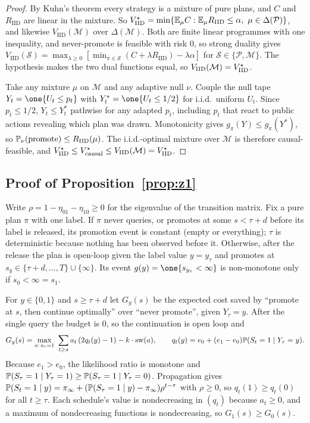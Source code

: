 \begin{proof}
By Kuhn's theorem every strategy is a mixture of pure plans, and $C$ and $R_{\mathrm{IID}}$ are linear in the mixture. So $V^\star_{\mathrm{IID}}=\min\{\mathbb{E}_\mu C:\mathbb{E}_\mu R_{\mathrm{IID}}\le\alpha,\ \mu\in\Delta(\mathcal P)\}$, and likewise $V_{\mathrm{IID}}(\mathcal M)$ over $\Delta(\mathcal M)$. Both are finite linear programmes with one inequality, and never-promote is feasible with risk 0, so strong duality gives $V_{\mathrm{IID}}(\mathcal S)=\max_{\lambda\ge0}[\min_{\pi\in\mathcal S}(C+\lambda R_{\mathrm{IID}})-\lambda\alpha]$ for $\mathcal S\in\{\mathcal P,\mathcal M\}$. The hypothesis makes the two dual functions equal, so $V_{\mathrm{IID}}(\mathcal M)=V^\star_{\mathrm{IID}}$.

Take any mixture $\mu$ on $\mathcal M$ and any adaptive null $\nu$. Couple the null tape $Y_t=\one\{U_t\le p_t\}$ with $Y^\ast_t=\one\{U_t\le1/2\}$ for i.i.d.\ uniform $U_t$. Since $p_t\le1/2$, $Y_t\le Y^\ast_t$ pathwise for any adapted $p_t$, including $p_t$ that react to public actions revealing which plan was drawn. Monotonicity gives $g_\pi(Y)\le g_\pi(Y^\ast)$, so $\mathbb{P}_\nu(\text{promote})\le R_{\mathrm{IID}}(\mu)$. The i.i.d.-optimal mixture over $\mathcal M$ is therefore causal-feasible, and $V^\star_{\mathrm{IID}}\le V^\star_{\mathrm{causal}}\le V_{\mathrm{IID}}(\mathcal M)=V^\star_{\mathrm{IID}}$.
\end{proof}

\subsection{Proof of Proposition~\ref{prop:z1}}

Write $\rho=1-\eta_{01}-\eta_{10}\ge0$ for the eigenvalue of the transition matrix. Fix a pure plan $\pi$ with one label. If $\pi$ never queries, or promotes at some $s<\tau+d$ before its label is released, its promotion event is constant (empty or everything); $\tau$ is deterministic because nothing has been observed before it. Otherwise, after the release the plan is open-loop given the label value $y=y_\tau$ and promotes at $s_y\in\{\tau+d,\dots,T\}\cup\{\infty\}$. Its event $g(y)=\one\{s_{y_\tau}<\infty\}$ is non-monotone only if $s_0<\infty=s_1$.

For $y\in\{0,1\}$ and $s\ge\tau+d$ let $G_y(s)$ be the expected cost saved by ``promote at $s$, then continue optimally'' over ``never promote'', given $Y_\tau=y$. After the single query the budget is 0, so the continuation is open loop and
\[
G_y(s)=\max_{a:\,a_s=1}\ \sum_{t\ge s}a_t\,(2q_t(y)-1)-k\cdot\mathrm{sw}(a),\qquad q_t(y)=e_0+(e_1-e_0)\mathbb{P}(S_t=1\mid Y_\tau=y).
\]
Because $e_1>e_0$, the likelihood ratio is monotone and $\mathbb{P}(S_\tau=1\mid Y_\tau=1)\ge\mathbb{P}(S_\tau=1\mid Y_\tau=0)$. Propagation gives $\mathbb{P}(S_t=1\mid y)=\pi_\infty+(\mathbb{P}(S_\tau=1\mid y)-\pi_\infty)\rho^{t-\tau}$ with $\rho\ge0$, so $q_t(1)\ge q_t(0)$ for all $t\ge\tau$. Each schedule's value is nondecreasing in $(q_t)$ because $a_t\ge0$, and a maximum of nondecreasing functions is nondecreasing, so $G_1(s)\ge G_0(s)$.

